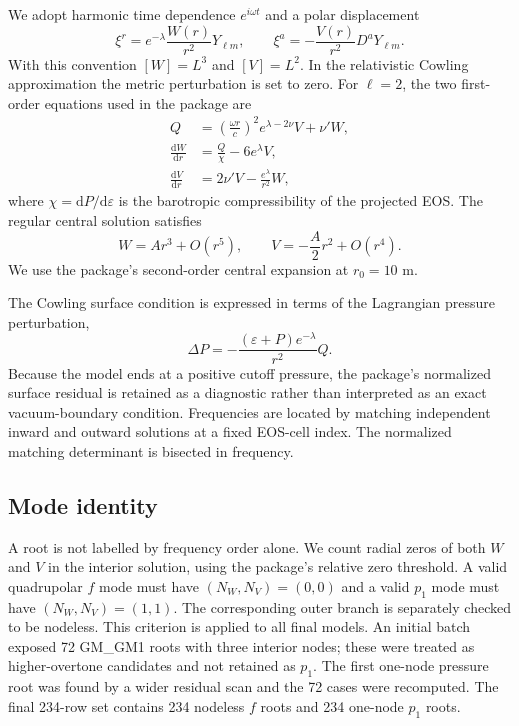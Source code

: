 \documentclass[aps,prd,twocolumn,superscriptaddress,nofootinbib]{revtex4-2}
\newcommand{\eps}{\varepsilon}
\newcommand{\dd}{\mathrm{d}}
\begin{document}
We adopt harmonic time dependence $e^{i\omega t}$ and a polar displacement
\begin{equation}
\xi^r=e^{-\lambda}\frac{W(r)}{r^2}Y_{\ell m},\qquad
\xi^a=-\frac{V(r)}{r^2}D^aY_{\ell m}.
\end{equation}
With this convention $[W]=L^3$ and $[V]=L^2$. In the relativistic Cowling approximation the metric perturbation is set to zero. For $\ell=2$, the two first-order equations used in the package are
\begin{align}
Q&=\left(\frac{\omega r}{c}\right)^2e^{\lambda-2\nu}V
       +\nu'W,\label{eq:Q}\\
\frac{\dd W}{\dd r}&=\frac{Q}{\chi}-6e^\lambda V,\label{eq:W}\\
\frac{\dd V}{\dd r}&=2\nu'V-\frac{e^\lambda}{r^2}W,\label{eq:V}
\end{align}
where $\chi=\dd P/\dd\eps$ is the barotropic compressibility of the projected EOS. The regular central solution satisfies
\begin{equation}
W=A r^3+O(r^5),\qquad V=-\frac{A}{2}r^2+O(r^4).
\end{equation}
We use the package's second-order central expansion at $r_0=10$ m.

The Cowling surface condition is expressed in terms of the Lagrangian pressure perturbation,
\begin{equation}
\Delta P=-\frac{(\eps+P)e^{-\lambda}}{r^2}Q.
\end{equation}
Because the model ends at a positive cutoff pressure, the package's normalized surface residual is retained as a diagnostic rather than interpreted as an exact vacuum-boundary condition. Frequencies are located by matching independent inward and outward solutions at a fixed EOS-cell index. The normalized matching determinant is bisected in frequency.

\subsection{Mode identity}

A root is not labelled by frequency order alone. We count radial zeros of both $W$ and $V$ in the interior solution, using the package's relative zero threshold. A valid quadrupolar $f$ mode must have $(N_W,N_V)=(0,0)$ and a valid $p_1$ mode must have $(N_W,N_V)=(1,1)$. The corresponding outer branch is separately checked to be nodeless. This criterion is applied to all final models. An initial batch exposed 72 GM\_GM1 roots with three interior nodes; these were treated as higher-overtone candidates and not retained as $p_1$. The first one-node pressure root was found by a wider residual scan and the 72 cases were recomputed. The final 234-row set contains 234 nodeless $f$ roots and 234 one-node $p_1$ roots.
\end{document}
